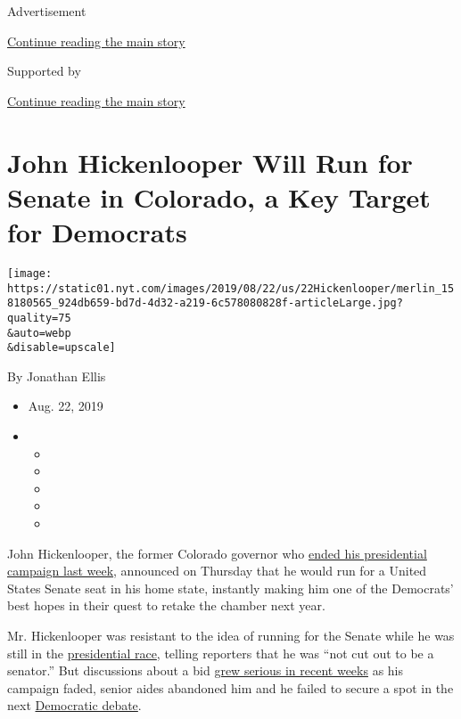 Advertisement

\protect\hyperlink{after-top}{Continue reading the main story}

Supported by

\protect\hyperlink{after-sponsor}{Continue reading the main story}

\hypertarget{john-hickenlooper-will-run-for-senate-in-colorado-a-key-target-for-democrats}{%
\section{John Hickenlooper Will Run for Senate in Colorado, a Key Target
for
Democrats}\label{john-hickenlooper-will-run-for-senate-in-colorado-a-key-target-for-democrats}}

\texttt{[image: https://static01.nyt.com/images/2019/08/22/us/22Hickenlooper/merlin\_158180565\_924db659-bd7d-4d32-a219-6c578080828f-articleLarge.jpg?quality=75\\\&auto=webp\\\&disable=upscale]}

By Jonathan Ellis

\begin{itemize}
\item
  Aug. 22, 2019
\item
  \begin{itemize}
  \item
  \item
  \item
  \item
  \item
  \end{itemize}
\end{itemize}

John Hickenlooper, the former Colorado governor who
\href{https://www.nytimes.com/2019/08/15/us/politics/john-hickenlooper-drop-out-senate.html}{ended
his presidential campaign last week}, announced on Thursday that he
would run for a United States Senate seat in his home state, instantly
making him one of the Democrats' best hopes in their quest to retake the
chamber next year.

Mr. Hickenlooper was resistant to the idea of running for the Senate
while he was still in the
\href{https://www.nytimes.com/news-event/2020-election}{presidential
race}, telling reporters that he was ``not cut out to be a senator.''
But discussions about a bid
\href{https://www.nytimes.com/2019/08/13/us/politics/john-hickenlooper-2020-senate.html}{grew
serious in recent weeks} as his campaign faded, senior aides abandoned
him and he failed to secure a spot in the next
\href{https://www.nytimes.com/news-event/democratic-debates}{Democratic
debate}.

